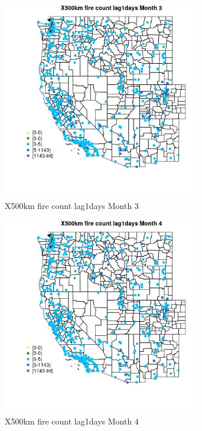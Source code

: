 \begin{figure} 
\centering  
\includegraphics[width=0.77\textwidth]{Code_Outputs/Report_ML_input_PM25_Step4_part_e_de_duplicated_aves_compiled_2019-05-14wNAs_MapObsMo3X500km_fire_count_lag1days.jpg} 
\caption{\label{fig:Report_ML_input_PM25_Step4_part_e_de_duplicated_aves_compiled_2019-05-14wNAsMapObsMo3X500km_fire_count_lag1days}X500km fire count lag1days Month 3} 
\end{figure} 
 

\begin{figure} 
\centering  
\includegraphics[width=0.77\textwidth]{Code_Outputs/Report_ML_input_PM25_Step4_part_e_de_duplicated_aves_compiled_2019-05-14wNAs_MapObsMo4X500km_fire_count_lag1days.jpg} 
\caption{\label{fig:Report_ML_input_PM25_Step4_part_e_de_duplicated_aves_compiled_2019-05-14wNAsMapObsMo4X500km_fire_count_lag1days}X500km fire count lag1days Month 4} 
\end{figure} 
 

